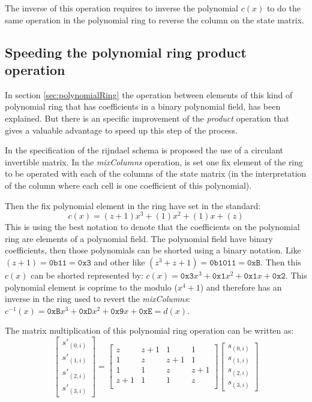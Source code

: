 \documentclass[10pt,a4paper,twoside]{llncs}
\begin{document}
The inverse of this operation requires to inverse the polynomial $c(x)$ to do the same operation in the polynomial ring to reverse the column on the state matrix.

\subsection{Speeding the polynomial ring product operation}\label{sec:improvePolynomialRingProduct}
In section \ref{sec:polynomialRing} the operation between elements of this kind of polynomial ring that has coefficients in a binary polynomial field, has been explained. But there is an specific improvement of the \emph{product} operation that gives a valuable advantage to speed up this step of the process. 

In the specification of the rijndael schema \cite{Daemen01aes-ammended} is proposed the use of a circulant invertible matrix. In the \emph{mixColumns} operation, is set one fix element of the ring to be operated with each of the columns of the state matrix (in the interpretation of the column where each cell is one coefficient of this polynomial).

Then the fix polynomial element in the ring have set in the standard:
$$c(x) = (z+1)x^3+(1)x^2+(1)x+(z)$$
This is using the best notation to denote that the coefficients on the polynomial ring are elements of a polynomial field. The polynomial field have binary coefficients, then those polynomials can be shorted using a binary notation. Like $(z+1)=\texttt{0b11}=\texttt{0x3}$ and other like $(z^3+z+1)=\texttt{0b1011}=\texttt{0xB}$. Then this $c(x)$ can be shorted represented by: $c(x) = \texttt{0x3}x^3+\texttt{0x1}x^2+\texttt{0x1}x+\texttt{0x2}$. This polynomial element is coprime to the modulo ($x^4+1$) and therefore has an inverse in the ring used to revert the \emph{mixColumns}: $c^{-1}(x) = \texttt{0xB}x^3+\texttt{0xD}x^2+\texttt{0x9}x+\texttt{0xE}=d(x)$.

The matrix multiplication of this polynomial ring operation can be written as:
\begin{equation}\label{eq:MDS}
  \begin{bmatrix}
    s'_{(0,i)}\\s'_{(1,i)}\\s'_{(2,i)}\\s'_{(3,i)}
  \end{bmatrix}
  =
  \begin{bmatrix}
    z & z+1 & 1 & 1 \\
    1 & z & z+1 & 1 \\
    1 & 1 & z & z+1 \\
    z+1 & 1 & 1 & z \\
  \end{bmatrix}
  \begin{bmatrix}
    s_{(0,i)}\\s_{(1,i)}\\s_{(2,i)}\\s_{(3,i)}
  \end{bmatrix}
\end{equation}
\end{document}
